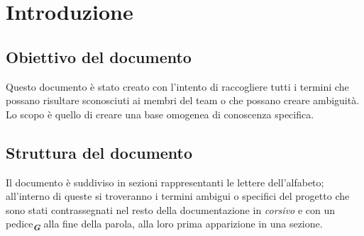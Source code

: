 


\section{Introduzione}

\subsection{Obiettivo del documento}
Questo documento è stato creato con l’intento di raccogliere tutti i termini che possano risultare sconosciuti ai membri del team o che possano creare 
ambiguità. Lo scopo è quello di creare una base omogenea di conoscenza specifica.

\subsection{Struttura del documento}
Il documento è suddiviso in sezioni rappresentanti le lettere dell’alfabeto; all’interno di queste si troveranno i termini ambigui o specifici del progetto 
che sono stati contrassegnati nel resto della documentazione in \emph{corsivo} e con un pedice\textsubscript{\textit{\textbf{G}}} alla fine della parola, alla loro prima apparizione in una sezione.
